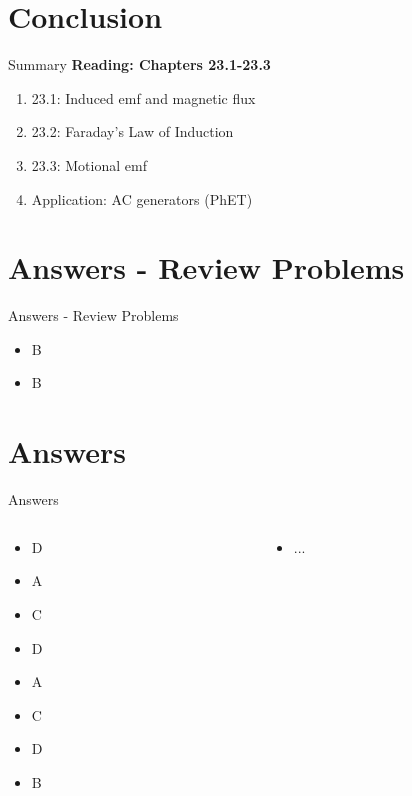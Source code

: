 \documentclass{beamer}
\begin{document}
\section{Conclusion}

\begin{frame}{Summary}
\textbf{Reading: Chapters 23.1-23.3} \\ \vspace{0.5cm}
\begin{enumerate}
\item 23.1: Induced emf and magnetic flux
\item 23.2: Faraday's Law of Induction
\item 23.3: Motional emf
\item Application: AC generators (PhET)
\end{enumerate}
\end{frame}

\section{Answers - Review Problems}

\begin{frame}{Answers - Review Problems}
\begin{itemize}
\item B
\item B
\end{itemize}
\end{frame}

\section{Answers}

\begin{frame}{Answers}
\small
\begin{columns}[T]
\begin{column}{0.5\textwidth}
\begin{itemize}
\item D
\item A
\item C
\item D
\item A
\item C
\item D
\item B
\end{itemize}
\end{column}
\begin{column}{0.5\textwidth}
\begin{itemize}
\item ...
\end{itemize}
\end{column}
\end{columns}
\end{frame}
\end{document}
